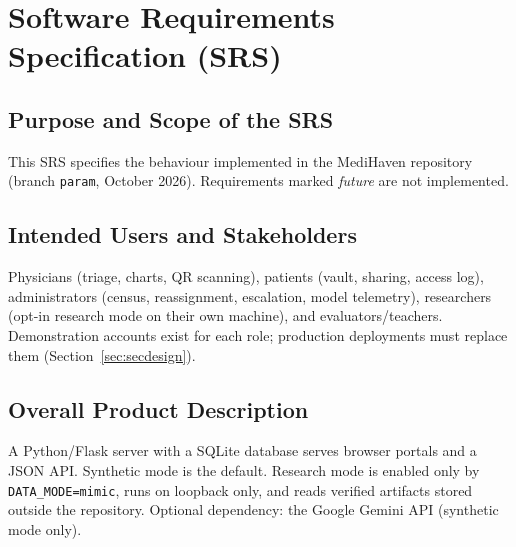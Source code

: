 \chapter{Software Requirements Specification (SRS)}
\label{ch:srs}

\section{Purpose and Scope of the SRS}
This SRS specifies the behaviour implemented in the MediHaven repository (branch \texttt{param}, October
2026). Requirements marked \emph{future} are not implemented.

\section{Intended Users and Stakeholders}
Physicians (triage, charts, QR scanning), patients (vault, sharing, access log), administrators (census,
reassignment, escalation, model telemetry), researchers (opt-in research mode on their own machine), and
evaluators/teachers. Demonstration accounts exist for each role; production deployments must replace
them (Section~\ref{sec:secdesign}).

\section{Overall Product Description}
A Python/Flask server with a SQLite database serves browser portals and a JSON API. Synthetic mode is the
default. Research mode is enabled only by \texttt{DATA\_MODE=mimic}, runs on loopback only, and reads
verified artifacts stored outside the repository. Optional dependency: the Google Gemini API (synthetic
mode only).

